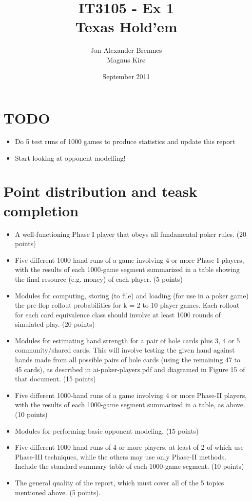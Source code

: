 \documentclass[titlepage]{article}
\author{Jan Alexander Bremnes\\Magnus Kirø}
\title{IT3105 - Ex 1\\Texas Hold'em}
\date{September 2011}
\begin{document}
    \maketitle

    \tableofcontents

\section*{TODO}
\begin{itemize}
\item   Do 5 test runs of 1000 games to produce statistics and update this report
\item   Start looking at opponent modelling!
\end{itemize}

\section*{Point distribution and teask completion}
\begin{itemize}
\item A well-functioning Phase I player that obeys all fundamental poker rules. (20 points)

\item Five different 1000-hand runs of a game involving 4 or more Phase-I players, with the results of each 1000-game segment summarized in a table showing the final resource (e.g. money) of each player. (5 points)

\item Modules for computing, storing (to file) and loading (for use in a poker game) the pre-flop rollout probabilities for k = 2 to 10 player games. Each rollout for each card equivalence class should involve at least 1000 rounds of simulated play. (20 points)

\item Modules for estimating hand strength for a pair of hole cards plus 3, 4 or 5 community/shared cards. This will involve testing the given hand against hands made from all possible pairs of hole cards (using the remaining 47 to 45 cards), as described in ai-poker-players.pdf and diagramed in Figure 15 of that document. (15 points)

\item Five different 1000-hand runs of a game involving 4 or more Phase-II players, with the results of each 1000-game segment summarized in a table, as above. (10 points)

\item Modules for performing basic opponent modeling. (15 points)

\item Five different 1000-hand runs of 4 or more players, at least of 2 of which use Phase-III techniques, while the others may use only Phase-II methods. Include the standard summary table of each 1000-game segment. (10 points)

\item The general quality of the report, which must cover all of the 5 topics mentioned above. (5 points).
\end{itemize}
\end{document}
